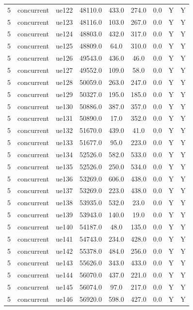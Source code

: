 \begin{table}[ht]
\begin{tabular}{|c|c|c|c|c|c|c|c|c|}
5 & concurrent & ue122 & 48110.0 & 433.0 & 274.0 & 0.0 & Y & Y \\
5 & concurrent & ue123 & 48116.0 & 103.0 & 267.0 & 0.0 & Y & Y \\
5 & concurrent & ue124 & 48803.0 & 432.0 & 317.0 & 0.0 & Y & Y \\
5 & concurrent & ue125 & 48809.0 & 64.0 & 310.0 & 0.0 & Y & Y \\
5 & concurrent & ue126 & 49543.0 & 436.0 & 46.0 & 0.0 & Y & Y \\
5 & concurrent & ue127 & 49552.0 & 109.0 & 58.0 & 0.0 & Y & Y \\
5 & concurrent & ue128 & 50059.0 & 263.0 & 247.0 & 0.0 & Y & Y \\
5 & concurrent & ue129 & 50327.0 & 195.0 & 185.0 & 0.0 & Y & Y \\
5 & concurrent & ue130 & 50886.0 & 387.0 & 357.0 & 0.0 & Y & Y \\
5 & concurrent & ue131 & 50890.0 & 17.0 & 352.0 & 0.0 & Y & Y \\
5 & concurrent & ue132 & 51670.0 & 439.0 & 41.0 & 0.0 & Y & Y \\
5 & concurrent & ue133 & 51677.0 & 95.0 & 223.0 & 0.0 & Y & Y \\
5 & concurrent & ue134 & 52526.0 & 582.0 & 533.0 & 0.0 & Y & Y \\
5 & concurrent & ue135 & 52526.0 & 250.0 & 534.0 & 0.0 & Y & Y \\
5 & concurrent & ue136 & 53269.0 & 606.0 & 438.0 & 0.0 & Y & Y \\
5 & concurrent & ue137 & 53269.0 & 223.0 & 438.0 & 0.0 & Y & Y \\
5 & concurrent & ue138 & 53935.0 & 532.0 & 23.0 & 0.0 & Y & Y \\
5 & concurrent & ue139 & 53943.0 & 140.0 & 19.0 & 0.0 & Y & Y \\
5 & concurrent & ue140 & 54187.0 & 48.0 & 135.0 & 0.0 & Y & Y \\
5 & concurrent & ue141 & 54743.0 & 234.0 & 428.0 & 0.0 & Y & Y \\
5 & concurrent & ue142 & 55378.0 & 484.0 & 256.0 & 0.0 & Y & Y \\
5 & concurrent & ue143 & 55626.0 & 343.0 & 433.0 & 0.0 & Y & Y \\
5 & concurrent & ue144 & 56070.0 & 437.0 & 221.0 & 0.0 & Y & Y \\
5 & concurrent & ue145 & 56074.0 & 97.0 & 217.0 & 0.0 & Y & Y \\
5 & concurrent & ue146 & 56920.0 & 598.0 & 427.0 & 0.0 & Y & Y \\

\end{tabular}
\end{table}
